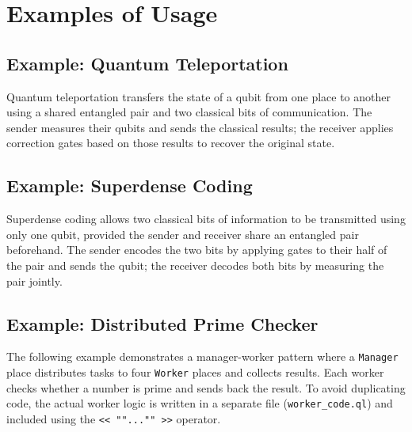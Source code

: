 \section{Examples of Usage}\label{sec:examples}

\subsection{Example: Quantum Teleportation}
\label{sec:teleportation}

Quantum teleportation transfers the state of a qubit from one place to
another using a shared entangled pair and two classical bits of
communication. The sender measures their qubits and sends the classical
results; the receiver applies correction gates based on those results to
recover the original state.



\subsection{Example: Superdense Coding}
\label{sec:superdense}

Superdense coding allows two classical bits of information to be
transmitted using only one qubit, provided the sender and receiver share
an entangled pair beforehand. The sender encodes the two bits by applying
gates to their half of the pair and sends the qubit; the receiver decodes
both bits by measuring the pair jointly.





\subsection{Example: Distributed Prime Checker}
\label{sec:worker-prime-example}

The following example demonstrates a manager-worker pattern where a
\texttt{Manager} place distributes tasks to four \texttt{Worker} places and
collects results. Each worker checks whether a number is prime and sends back
the result. To avoid duplicating code, the actual worker logic is written in a
separate file (\texttt{worker\_code.ql}) and included using the
\texttt{<< ""..."" >>} operator.

